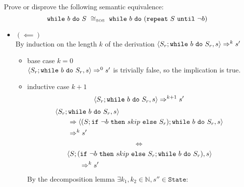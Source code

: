 \begin{exercise}{
    Prove or disprove the following semantic equivalence:
    \[ \wwhile{b}{S}\ \cong_{\text{\tiny SOS}}\ \wwhile{b}{(\wrepeat{S}{\neg b})}  \]
}
\begin{itemize}
\begin{itemize}
\begin{itemize}
\begin{itemize}
\begin{align*}
                                        \\
                                        &\instr{\wif{\neg b}{skip}{S_r}; \wwhile{b}{S_r}}{s''}
                                        \\&\qquad\Rightarrow \instr{S_r; \wwhile{b}{S_r}}{s''}
                                    \end{align*}
                                    Since $\instr{S; \wwhile{b}{S}}{s''} \Rightarrow^{k_2 - 2} s'$ and $k_2 - 2 = k - k_1 - 1 \leq k$ the inductive hypothesis holds and thus $\instr{S_r; \wwhile{b}{S_r}}{s''} \Rightarrow^* s'$
                            \end{itemize}
                    \end{itemize}
                \item $(\impliedby)$ \vspace{0.2cm} \\
                    By induction on the length $k$ of the derivation $\left<S_r; \texttt{while}\ b\ \texttt{do}\ S_r, s\right> \Rightarrow^k s'$
                    \begin{itemize}
                        \item base case $k=0$ \\
                            $\left<S_r; \texttt{while}\ b\ \texttt{do}\ S_r, s\right> \Rightarrow^0 s'$ is trivially false, so the implication is true.
                        \item inductive case $k+1$ \vspace*{-0.3cm}
                        \[ \left<S_r; \texttt{while}\ b\ \texttt{do}\ S_r, s\right> \Rightarrow^{k+1} s' \]
                        \begin{align*}
                            &\left<S_r; \texttt{while}\ b\ \texttt{do}\ S_r, s\right>
                            \\&\qquad\Rightarrow \left<(S; \texttt{if}\ \neg b\ \texttt{then}\ skip\ \texttt{else}\ S_r); \texttt{while}\ b\ \texttt{do}\ S_r, s\right>
                            \\&\qquad\Rightarrow^{k} s'
                        \end{align*}
                        \[ \iff \]
                        \begin{align*}
                            &\left<S; (\texttt{if}\ \neg b\ \texttt{then}\ skip\ \texttt{else}\ S_r; \texttt{while}\ b\ \texttt{do}\ S_r), s\right>
                            \\&\qquad\Rightarrow^{k} s'
                        \end{align*}
                        By the decomposition lemma $\exists k_1, k_2 \in \mathbb{N}, s'' \in \texttt{State} :$
                        \begin{gather*}

\end{gather*}
\end{itemize}
\end{itemize}
\end{itemize}
\end{exercise}
